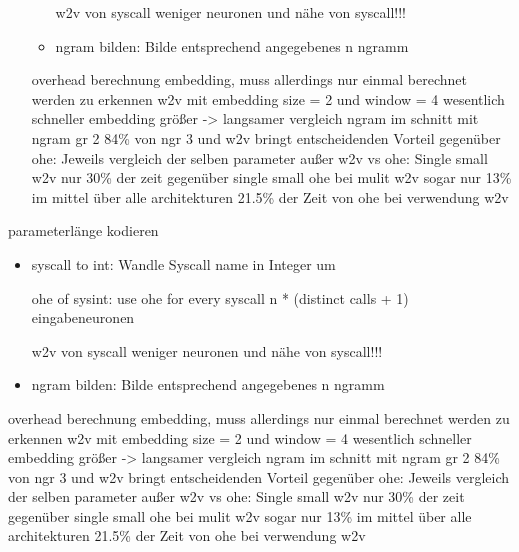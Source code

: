 \begin{itemize}
\begin{itemize}
                     w2v von syscall
                     weniger neuronen und nähe von syscall!!!
                    \item ngram bilden: Bilde entsprechend angegebenes n ngramm
                \end{itemize}
                overhead berechnung embedding, muss allerdings nur einmal berechnet werden
                zu erkennen w2v mit embedding size = 2  und window = 4 wesentlich schneller
                embedding größer -> langsamer
                vergleich ngram
                im schnitt mit ngram gr 2 84\% von ngr 3 und 
                w2v bringt entscheidenden Vorteil gegenüber ohe:
                Jeweils vergleich der selben parameter außer w2v vs ohe:
                Single small w2v nur 30\% der zeit gegenüber single small ohe
                bei mulit w2v sogar nur 13\%
                im mittel über alle architekturen 21.5\% der Zeit von ohe bei verwendung w2v
                \end{itemize}
                parameterlänge kodieren
                \begin{itemize}
                    \item syscall to int: Wandle Syscall name in Integer um

                     ohe of sysint: use ohe for every syscall 
                     n * (distinct calls + 1) eingabeneuronen 

                     w2v von syscall
                     weniger neuronen und nähe von syscall!!!
                    \item ngram bilden: Bilde entsprechend angegebenes n ngramm
                \end{itemize}
                overhead berechnung embedding, muss allerdings nur einmal berechnet werden
                zu erkennen w2v mit embedding size = 2  und window = 4 wesentlich schneller
                embedding größer -> langsamer
                vergleich ngram
                im schnitt mit ngram gr 2 84\% von ngr 3 und 
                w2v bringt entscheidenden Vorteil gegenüber ohe:
                Jeweils vergleich der selben parameter außer w2v vs ohe:
                Single small w2v nur 30\% der zeit gegenüber single small ohe
                bei mulit w2v sogar nur 13\%
                im mittel über alle architekturen 21.5\% der Zeit von ohe bei verwendung w2v

